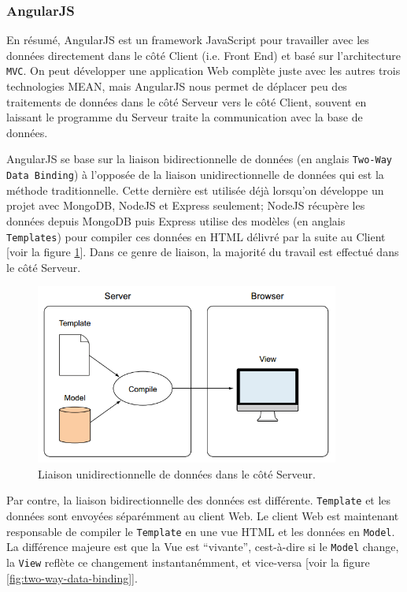 \subsubsection{AngularJS}

En résumé, AngularJS est un framework JavaScript pour travailler avec les données directement dans le côté Client (i.e. Front End) et basé sur l'architecture \texttt{MVC}\cite{mvcArchitecture}. On peut développer une application Web complète juste avec les autres trois technologies MEAN, mais AngularJS nous permet de déplacer peu des traitements de données dans le côté Serveur vers le côté Client, souvent en laissant le programme du Serveur traite la communication avec la base de données.
\newline

AngularJS se base sur la liaison bidirectionnelle de données (en anglais \texttt{Two-Way Data Binding}) à l'opposée de la liaison unidirectionnelle de données qui est la méthode traditionnelle. Cette dernière est utilisée déjà lorsqu'on développe un projet avec MongoDB, NodeJS et Express seulement; NodeJS récupère les données depuis MongoDB puis Express utilise des modèles (en anglais \texttt{Templates}) pour compiler ces données en HTML délivré par la suite au Client [voir la figure \ref{fig:one-way-data-binding}]. Dans ce genre de liaison, la majorité du travail est effectué dans le côté Serveur. 

\begin{figure}[H]
    \centering
    \includegraphics[width=10cm]{images/one-way-data-binding.png}
    \caption{Liaison unidirectionnelle de données dans le côté Serveur.}
    \label{fig:one-way-data-binding}
\end{figure}

Par contre, la liaison bidirectionnelle des données est différente. \texttt{Template} et les données sont envoyées séparémment au client Web. Le client Web est maintenant responsable de compiler le \texttt{Template} en une vue HTML et les données en \texttt{Model}. La différence majeure est que la Vue est ``vivante'', cest-à-dire si le \texttt{Model} change, la \texttt{View} reflète ce changement instantanémment, et vice-versa [voir la figure \ref{fig:two-way-data-binding}].

